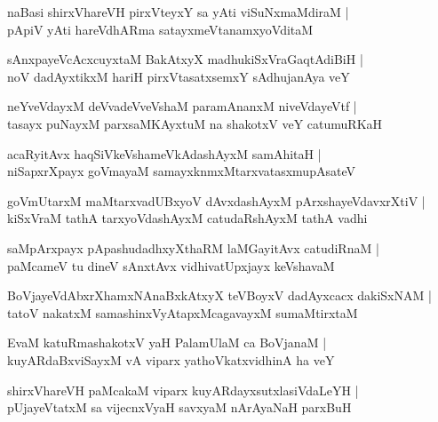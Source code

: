 \begin{shloka}
naBasi shirxVhareVH pirxVteyxY sa yAti viSuNxmaMdiraM |\\
pApiV yAti hareVdhARma satayxmeVtanamxyoVditaM 
\end{shloka}

\begin{shloka}
sAnxpayeVcAcxcuyxtaM BakAtxyX madhukiSxVraGaqtAdiBiH |\\
noV dadAyxtikxM hariH pirxVtasatxsemxY sAdhujanAya veY
\end{shloka}

\begin{shloka}
neYveVdayxM deVvadeVveVshaM paramAnanxM niveVdayeVtf |\\
tasayx puNayxM parxsaMKAyxtuM na shakotxV veY catumuRKaH
\end{shloka}

\begin{shloka}
acaRyitAvx haqSiVkeVshameVkAdashAyxM samAhitaH |\\
niSapxrXpayx goVmayaM samayxknmxMtarxvatasxmupAsateV
\end{shloka}

\begin{shloka}
goVmUtarxM maMtarxvadUBxyoV dAvxdashAyxM pArxshayeVdavxrXtiV |\\
kiSxVraM tathA tarxyoVdashAyxM catudaRshAyxM tathA vadhi
\end{shloka}

\begin{shloka}
saMpArxpayx pApashudadhxyXthaRM laMGayitAvx catudiRnaM |\\
paMcameV tu dineV sAnxtAvx vidhivatUpxjayx keVshavaM 
\end{shloka}

\begin{shloka}
BoVjayeVdAbxrXhamxNAnaBxkAtxyX teVBoyxV dadAyxcacx dakiSxNAM |\\
tatoV nakatxM samashinxVyAtapxMcagavayxM sumaMtirxtaM 
\end{shloka}

\begin{shloka}
EvaM katuRmashakotxV yaH PalamUlaM ca BoVjanaM |\\
kuyARdaBxviSayxM vA viparx yathoVkatxvidhinA ha veY
\end{shloka}

\begin{shloka}
shirxVhareVH paMcakaM viparx kuyARdayxsutxlasiVdaLeYH |\\
pUjayeVtatxM sa vijecnxVyaH savxyaM nArAyaNaH parxBuH
\end{shloka}

